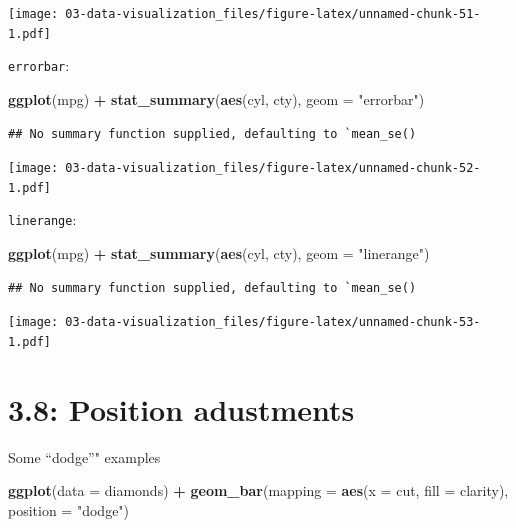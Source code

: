 \documentclass[]{book}
\newenvironment{Shaded}{\begin{snugshade}}{\end{snugshade}}
\newcommand{\DataTypeTok}[1]{\textcolor[rgb]{0.13,0.29,0.53}{#1}}
\newcommand{\KeywordTok}[1]{\textcolor[rgb]{0.13,0.29,0.53}{\textbf{#1}}}
\newcommand{\NormalTok}[1]{#1}
\newcommand{\OperatorTok}[1]{\textcolor[rgb]{0.81,0.36,0.00}{\textbf{#1}}}
\newcommand{\StringTok}[1]{\textcolor[rgb]{0.31,0.60,0.02}{#1}}
\theoremstyle{definition}
\theoremstyle{definition}
\theoremstyle{definition}
\theoremstyle{remark}
\begin{document}
\texttt{[image: 03-data-visualization\_files/figure-latex/unnamed-chunk-51-1.pdf]}

\texttt{errorbar}:

\begin{Shaded}
\begin{Highlighting}[]
\KeywordTok{ggplot}\NormalTok{(mpg) }\OperatorTok{+}
\StringTok{  }\KeywordTok{stat_summary}\NormalTok{(}\KeywordTok{aes}\NormalTok{(cyl, cty), }\DataTypeTok{geom =} \StringTok{"errorbar"}\NormalTok{)}
\end{Highlighting}
\end{Shaded}

\begin{verbatim}
## No summary function supplied, defaulting to `mean_se()
\end{verbatim}

\texttt{[image: 03-data-visualization\_files/figure-latex/unnamed-chunk-52-1.pdf]}

\texttt{linerange}:

\begin{Shaded}
\begin{Highlighting}[]
\KeywordTok{ggplot}\NormalTok{(mpg) }\OperatorTok{+}
\StringTok{  }\KeywordTok{stat_summary}\NormalTok{(}\KeywordTok{aes}\NormalTok{(cyl, cty), }\DataTypeTok{geom =} \StringTok{"linerange"}\NormalTok{)}
\end{Highlighting}
\end{Shaded}

\begin{verbatim}
## No summary function supplied, defaulting to `mean_se()
\end{verbatim}

\texttt{[image: 03-data-visualization\_files/figure-latex/unnamed-chunk-53-1.pdf]}

\hypertarget{position-adustments}{%
\section{3.8: Position adustments}\label{position-adustments}}

Some ``dodge''" examples

\begin{Shaded}
\begin{Highlighting}[]
\KeywordTok{ggplot}\NormalTok{(}\DataTypeTok{data =}\NormalTok{ diamonds) }\OperatorTok{+}\StringTok{ }
\StringTok{  }\KeywordTok{geom_bar}\NormalTok{(}\DataTypeTok{mapping =} \KeywordTok{aes}\NormalTok{(}\DataTypeTok{x =}\NormalTok{ cut, }\DataTypeTok{fill =}\NormalTok{ clarity), }\DataTypeTok{position =} \StringTok{"dodge"}\NormalTok{)}
\end{Highlighting}
\end{Shaded}
\end{document}
